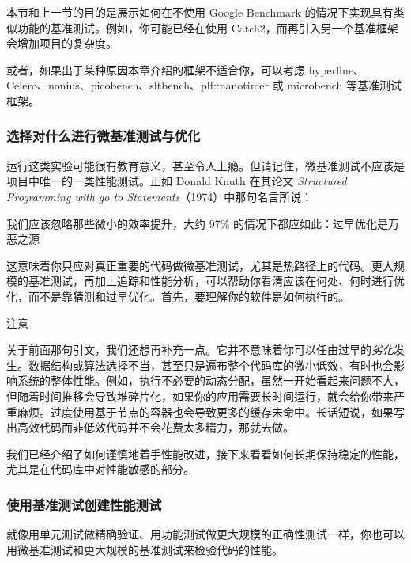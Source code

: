 \label{idx:1186}
\label{idx:1187}
本节和上一节的目的是展示如何在不使用 Google Benchmark 的情况下实现具有类似功能的基准测试。例如，你可能已经在使用 Catch2，而再引入另一个基准框架会增加项目的复杂度。

或者，如果出于某种原因本章介绍的框架不适合你，可以考虑 hyperfine、Celero、nonius、picobench、sltbench、plf::nanotimer 或 microbench 等基准测试框架。

\subsubsection{选择对什么进行微基准测试与优化}

\label{idx:1188}
运行这类实验可能很有教育意义，甚至令人上瘾。但请记住，微基准测试不应该是项目中唯一的一类性能测试。正如 Donald Knuth 在其论文 \emph{Structured Programming with go to Statements}（1974）中那句名言所说：

\begin{myQuote}
我们应该忽略那些微小的效率提升，大约 97\% 的情况下都应如此：过早优化是万恶之源

\end{myQuote}

这意味着你只应对真正重要的代码做微基准测试，尤其是热路径上的代码。更大规模的基准测试，再加上追踪和性能分析，可以帮助你看清应该在何处、何时进行优化，而不是靠猜测和过早优化。首先，要理解你的软件是如何执行的。

\begin{myNotic}{注意}

关于前面那句引文，我们还想再补充一点。它并不意味着你可以任由过早的\emph{劣化}发生。数据结构或算法选择不当，甚至只是遍布整个代码库的微小低效，有时也会影响系统的整体性能。例如，执行不必要的动态分配，虽然一开始看起来问题不大，但随着时间推移会导致堆碎片化，如果你的应用需要长时间运行，就会给你带来严重麻烦。过度使用基于节点的容器也会导致更多的缓存未命中。长话短说，如果写出高效代码而非低效代码并不会花费太多精力，那就去做。
\end{myNotic}

\label{idx:1189}
我们已经介绍了如何谨慎地着手性能改进，接下来看看如何长期保持稳定的性能，尤其是在代码库中对性能敏感的部分。

\subsubsection{使用基准测试创建性能测试}

\label{idx:1190}
就像用单元测试做精确验证、用功能测试做更大规模的正确性测试一样，你也可以用微基准测试和更大规模的基准测试来检验代码的性能。

